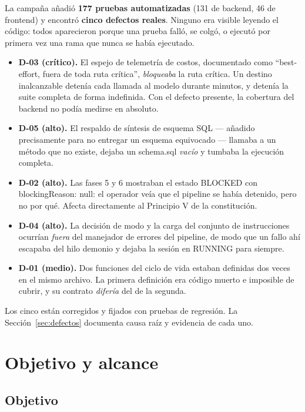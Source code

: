 \documentclass[11pt,a4paper]{article}
\newcommand{\code}[1]{{\ttfamily\small\def\_{\textunderscore\allowbreak}#1}}
\begin{document}
\noindent
La campaña añadió \textbf{177 pruebas automatizadas} (131 de backend, 46 de frontend) y
encontró \textbf{cinco defectos reales}. Ninguno era visible leyendo el código: todos
aparecieron porque una prueba falló, se colgó, o ejecutó por primera vez una rama que nunca
se había ejecutado.

\begin{itemize}[leftmargin=1.4em]
\item \textbf{D-03 (crítico).} El espejo de telemetría de costos, documentado como
      ``best-effort, fuera de toda ruta crítica'', \emph{bloqueaba} la ruta crítica. Un
      destino inalcanzable detenía cada llamada al modelo durante minutos, y detenía la
      suite completa de forma indefinida. Con el defecto presente, la cobertura del backend
      no podía medirse en absoluto.
\item \textbf{D-05 (alto).} El respaldo de síntesis de esquema SQL --- añadido precisamente
      para no entregar un esquema equivocado --- llamaba a un método que no existe, dejaba un
      \code{schema.sql} \emph{vacío} y tumbaba la ejecución completa.
\item \textbf{D-02 (alto).} Las fases 5 y 6 mostraban el estado \code{BLOCKED} con
      \code{blockingReason: null}: el operador veía que el pipeline se había detenido, pero
      no por qué. Afecta directamente al Principio V de la constitución.
\item \textbf{D-04 (alto).} La decisión de modo y la carga del conjunto de instrucciones
      ocurrían \emph{fuera} del manejador de errores del pipeline, de modo que un fallo ahí
      escapaba del hilo demonio y dejaba la sesión en \code{RUNNING} para siempre.
\item \textbf{D-01 (medio).} Dos funciones del ciclo de vida estaban definidas dos veces en
      el mismo archivo. La primera definición era código muerto e imposible de cubrir, y su
      contrato \emph{difería} del de la segunda.
\end{itemize}

\noindent
Los cinco están corregidos y fijados con pruebas de regresión. La Sección~\ref{sec:defectos}
documenta causa raíz y evidencia de cada uno.

\section{Objetivo y alcance}

\subsection{Objetivo}
\end{document}
